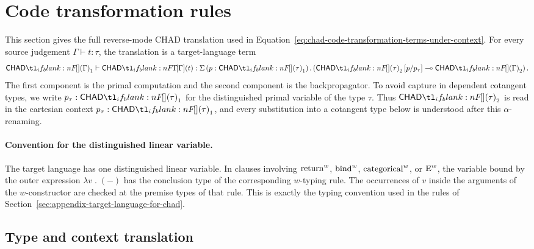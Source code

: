 \documentclass[11pt,a4paper]{article}
\theoremstyle{definition}
\theoremstyle{remark}
\providecommand{\casubst}[3]{#1[#3/#2]}
\providecommand{\linto}{\multimap}
\begin{document}
\section{Code transformation rules}
\label{sec:appendix-code-transformation-rules}

This section gives the full reverse-mode CHAD translation used in
Equation~\eqref{eq:chad-code-transformation-terms-under-context}.  For every source judgement
\( \Gamma \vdash t : \tau \), the translation is a target-language term
\begin{equation}
  \label{eq:appendix-chad-term-typing-shape}
  \Fun[np]{\chad}{\Gamma}_{1}
  \vdash
  \Fun[np]{\chad[\Gamma]}{t}
  :
  \Sigma \left( p : \Fun[np]{\chad}{\tau}_{1} \right)
  .
  \left(
    \casubst{\Fun[np]{\chad}{\tau}_{2}}{p_{\tau}}{p}
    \linto
    \Fun[np]{\chad}{\Gamma}_{2}
  \right).
\end{equation}
The first component is the primal computation and the second component is the
backpropagator.  To avoid capture in dependent cotangent types, we write
\(p_{\tau} : \Fun[np]{\chad}{\tau}_{1}\) for the distinguished primal
variable of the type \(\tau\).  Thus \(\Fun[np]{\chad}{\tau}_{2}\) is read
in the cartesian context
\(p_{\tau} : \Fun[np]{\chad}{\tau}_{1}\), and every substitution into a
cotangent type below is understood after this \(\alpha\)-renaming.

\paragraph{Convention for the distinguished linear variable.}
The target language has one distinguished linear variable.  In clauses involving
\(\opn[b]{return}^{w}\), \(\opn[b]{bind}^{w}\),
\(\opn[b]{categorical}^{w}\), or \(\opn[b]{E}^{w}\), the variable bound by the
outer expression \(\lambda v\; .\;(-)\) has the conclusion type of the
corresponding \(w\)-typing rule.  The occurrences of \(v\) inside the arguments
of the \(w\)-constructor are checked at the premise types of that rule.  This is
exactly the typing convention used in the rules of
Section~\ref{sec:appendix-target-language-for-chad}.

\subsection{Type and context translation}
\end{document}
